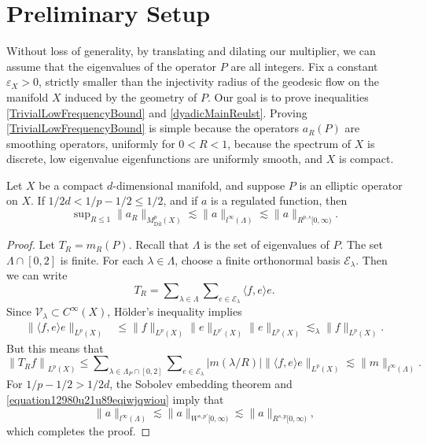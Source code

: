 \section{Preliminary Setup} \label{PrelimSetup}

Without loss of generality, by translating and dilating our multiplier, we can assume that the eigenvalues of the operator $P$ are all integers. Fix a constant $\varepsilon_X > 0$, strictly smaller than the injectivity radius of the geodesic flow on the manifold $X$ induced by the geometry of $P$. Our goal is to prove inequalities \eqref{TrivialLowFrequencyBound} and \eqref{dyadicMainReulst}. Proving \eqref{TrivialLowFrequencyBound} is simple because the operators $a_R(P)$ are smoothing operators, uniformly for $0 < R < 1$, because the spectrum of $X$ is discrete, low eigenvalue eigenfunctions are uniformly smooth, and $X$ is compact.

\begin{lemma} \label{lowjLemma}
    Let $X$ be a compact $d$-dimensional manifold, and suppose $P$ is an elliptic operator on $X$. If $1/2d < 1/p - 1/2 \leq 1/2$, and if $a$ is a regulated function, then
    \[ \sup\nolimits_{R \leq 1} \| a_R \|_{M^p_{\text{Dil}}(X)} \lesssim \| a \|_{l^\infty(\Lambda)} \lesssim \| a \|_{R^{p,s}[0,\infty)}. \]
\end{lemma}
\begin{proof}
    Let $T_R = m_R(P)$. Recall that $\Lambda$ is the set of eigenvalues of $P$. The set $\Lambda \cap [0,2]$ is finite. For each $\lambda \in \Lambda$, choose a finite orthonormal basis $\mathcal{E}_\lambda$. Then we can write
    \begin{equation}
        T_R = \sum\nolimits_{\lambda \in \Lambda} \sum\nolimits_{e \in \mathcal{E}_\lambda} \langle f, e \rangle e.
    \end{equation}
    Since $\mathcal{V}_\lambda \subset C^\infty(X)$, H\"{o}lder's inequality implies
    \begin{equation}
    \begin{split}
        \| \langle f, e \rangle e \|_{L^p(X)} &\leq \| f \|_{L^p(X)} \| e \|_{L^{p'}(X)} \| e \|_{L^p(X)} \lesssim_\lambda \| f \|_{L^p(X)}.
    \end{split}
    \end{equation}
    But this means that
    \begin{equation}
        \left\| T_R f \right\|_{L^p(X)} \leq \sum\nolimits_{\lambda \in \Lambda_P \cap [0,2]} \sum\nolimits_{e \in \mathcal{E}_\lambda} |m(\lambda/R)| \| \langle f, e \rangle e \|_{L^p(X)} \lesssim \| m \|_{l^\infty(\Lambda)}.
    \end{equation}
    For $1/p - 1/2 > 1/2d$, the Sobolev embedding theorem and \eqref{equation12980u21u89eqiwjqwiou} imply that
    \begin{equation}
        \| a \|_{l^\infty(\Lambda)} \lesssim \| a \|_{W^{s,p'}[0,\infty)} \lesssim \| a \|_{R^{s,p}[0,\infty)},
    \end{equation}
    which completes the proof.
\end{proof}

